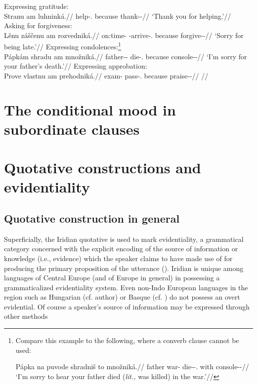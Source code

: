 \pex
\a Expressing gratitude:\\
\begingl
\gla Stranu am luhninká.//
\glb help-\Cv{}.\Pf{} because thank-\Pv{}-\Hort{}//
\glft `Thank you for helping.'//
\endgl
\a Asking for forgiveness:\\
\begingl
\gla Lěnu záščenu am rozvedniká.//
\glb on:time-\Ins{} \Neg{}-arrive-\Cv{}.\Pf{} because forgive-\Pv{}-\Hort{}//
\glft `Sorry for being late.'//
\endgl
\a Expressing condolences:\footnote{Compare this example to the following, where
a converb clause cannot be used:

\ex[lingstyle=fnex,belowexskip=-1em]
\begingl
\gla Pápka na puvode shradniš to množniká.//
\glb father \Loc{} war-\Acc{} die-\Pv{}-\Subj.\Pf{} \Rz{} with console-\Pv{}-\Hort{}//
\glft `I'm sorry to hear your father died (\emph{lit.,} was killed) in the war.'//
\endgl\xe}\\
\begingl
\gla Pápkám shradu am množniká.//
\glb father-\Dim{}-\Agt{} die-\Cv{}.\Pf{} because console-\Pv{}-\Hort{}//
\glft `I'm sorry for your father's death.'//
\endgl
\a Expressing approbation:\\
\begingl
\gla Prove vlastnu am prehodniká.//
\glb exam-\Acc{} pass-\Cv{}.\Pf{} because praise-\Pv{}-\Hort{}//
\glft {}//
\endgl
\xe

\section{The conditional mood in subordinate clauses}
\label{sec:conditional-subordinate}

\section{Quotative constructions and  evidentiality}\label{sec:reportedspeech}

\subsection{Quotative construction in general}

Superficially, the Iridian quotative is used to mark {\sc evidentiality}, a
grammatical category concerned with the explicit encoding of the source of
information or knowledge (i.e., evidence) which the speaker claims to have made
use of for producing the primary proposition of the utterance
(\cite[1-2]{diewald2010}). Iridian is unique among languages of Central Europe
(and of Europe in general) in possessing a grammaticalized evidentiality system.
Even non-Indo European languages in the region such as Hungarian (cf. author) or
Basque (cf. \cite{alcazar2010}) do not possess an overt evidential. Of course a
speaker’s source of information may be expressed through other methods 


